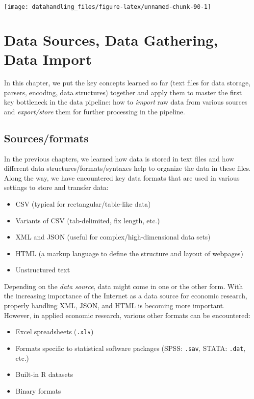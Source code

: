 \documentclass[
  12pt,
]{style/krantz}
\providecommand{\tightlist}{%
  \setlength{\itemsep}{0pt}\setlength{\parskip}{0pt}}
\begin{document}
\texttt{[image: datahandling\_files/figure-latex/unnamed-chunk-90-1]}

\hypertarget{data-sources-data-gathering-data-import}{%
\chapter{Data Sources, Data Gathering, Data Import}\label{data-sources-data-gathering-data-import}}

In this chapter, we put the key concepts learned so far (text files for data storage, parsers, encoding, data structures) together and apply them to master the first key bottleneck in the data pipeline: how to \emph{import} raw data from various sources and \emph{export/store} them for further processing in the pipeline.

\hypertarget{sourcesformats}{%
\section{Sources/formats}\label{sourcesformats}}

In the previous chapters, we learned how data is stored in text files and how different data structures/formats/syntaxes help to organize the data in these files. Along the way, we have encountered key data formats that are used in various settings to store and transfer data:

\begin{itemize}
\tightlist
\item
  CSV (typical for rectangular/table-like data)
\item
  Variants of CSV (tab-delimited, fix length, etc.)
\item
  XML and JSON (useful for complex/high-dimensional data sets)
\item
  HTML (a markup language to define the structure and layout of webpages)
\item
  Unstructured text
\end{itemize}

Depending on the \emph{data source}, data might come in one or the other form. With the increasing importance of the Internet as a data source for economic research, properly handling XML, JSON, and HTML is becoming more important. However, in applied economic research, various other formats can be encountered:

\begin{itemize}
\tightlist
\item
  Excel spreadsheets (\texttt{.xls})
\item
  Formats specific to statistical software packages (SPSS: \texttt{.sav}, STATA: \texttt{.dat}, etc.)
\item
  Built-in R datasets
\item
  Binary formats
\end{itemize}
\end{document}
